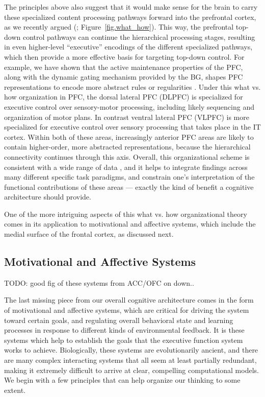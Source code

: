 \documentclass[11pt,twoside]{article}
\begin{document}
The principles above also suggest that it would make sense for the brain to
carry these specialized content processing pathways forward into the
prefrontal cortex, as we recently argued (; Figure~\ref{fig.what_how}).  This way, the prefrontal top-down control
pathways can continue the hierarchical processing stages, resulting in even
higher-level ``executive'' encodings of the different specialized pathways,
which then provide a more effective basis for targeting top-down control.  For
example, we have shown that the active maintenance properties of the PFC,
along with the dynamic gating mechanism provided by the BG, shapes PFC
representations to encode more abstract rules or regularities
\cite{RougierNoelleBraverEtAl05}.  Under this what vs. how organization in PFC, the dorsal
lateral PFC (DLPFC) is specialized for executive control over sensory-motor
processing, including likely sequencing and organization of motor plans.  In
contrast ventral lateral PFC (VLPFC) is more specialized for executive control
over sensory processing that takes place in the IT cortex.  Within both of
these areas, increasingly anterior PFC areas are likely to contain
higher-order, more abstracted representations, because the hierarchical
connectivity continues through this axis.  Overall, this organizational scheme
is consistent with a wide range of data \cite{OReilly10}, and it helps to
integrate findings across many different specific task paradigms, and
constrain one's interpretation of the functional contributions of these areas
--- exactly the kind of benefit a cognitive architecture should
provide.

One of the more intriguing aspects of this what vs. how organizational theory
comes in its application to motivational and affective systems, which include
the medial surface of the frontal cortex, as discussed next.

\subsection{Motivational and Affective Systems}

TODO: good fig of these systems from ACC/OFC on down..

The last missing piece from our overall cognitive architecture comes in the
form of motivational and affective systems, which are critical for driving the
system toward certain goals, and regulating overall behavioral state and
learning processes in response to different kinds of environmental feedback.
It is these systems which help to establish the goals that the executive
function system works to achieve.  Biologically, these systems are
evolutionarily ancient, and there are many complex interacting systems that
all seem at least partially redundant, making it extremely difficult to arrive
at clear, compelling computational models.  We begin with a few principles
that can help organize our thinking to some extent.
\end{document}
